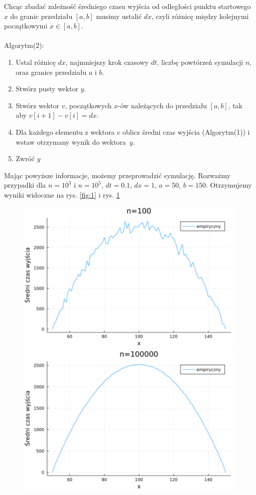 \documentclass{article}
\theoremstyle{break}
\begin{document}
Chcąc zbadać zależność średniego czasu wyjścia od odległości punktu startowego $x$ do granic przedziału $[a,b]$ musimy ustalić $dx$, czyli różnicę między kolejnymi początkowymi $x \in [a,b]$.\\ \\ 
Algorytm(2):
\begin{enumerate}
	\item Ustal różnicę $dx$, najmniejszy krok czasowy $dt$, liczbę powtórzeń symulacji $n$, oraz granice przedziału $a$ i $b$.
	\item Stwórz pusty wektor $y$.
	\item Stwórz wektor $v$, początkowych $x$-ów należących do przedziału $[a,b]$, tak aby $v[i+1]-v[i]=dx$.
	\item Dla każdego elementu z wektora $v$ oblicz średni czas wyjścia (Algorytm(1)) i wstaw otrzymany wynik do wektora~$y$.
	\item Zwróć $y$
\end{enumerate}
Mając powyższe informacje, możemy przeprowadzić symulację. Rozważmy przypadki dla $n=10^3$ i $n=10^5$, $dt=0.1$, $dx=1$, $a=50$, $b=150$. Otrzymujemy wyniki widoczne na rys. \ref{fig:1} i rys. \ref{fig:2}
\begin{figure}[H]
	\begin{multicols}{2}
	\begin{center}
	\includegraphics[scale=0.30]{time100.pdf}
	\caption{}
	\label{fig:1}
	\includegraphics[scale=0.30]{time100000.pdf}
	\caption{}
	\label{fig:2}
	\end{center}
	\end{multicols}
\end{figure}
\end{document}
